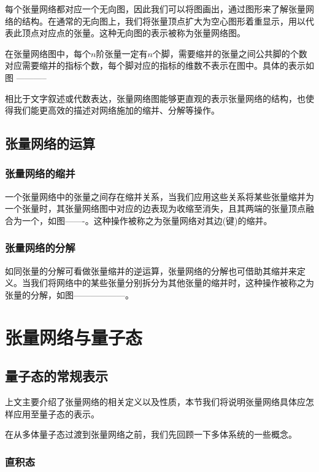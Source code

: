 每个张量网络都对应一个无向图，因此我们可以将图画出，通过图形来了解张量网络的结构。在通常的无向图上，我们将张量顶点扩大为空心图形着重显示，用以代表此顶点对应点的张量。这种无向图的表示被称为张量网络图。

在张量网络图中，每个$n$阶张量一定有$n$个脚，需要缩并的张量之间公共脚的个数对应需要缩并的指标个数，每个脚对应的指标的维数不表示在图中。具体的表示如图 -----------

相比于文字叙述或代数表达，张量网络图能够更直观的表示张量网络的结构，也使得我们能更高效的描述对网络施加的缩并、分解等操作。

\subsection{张量网络的运算}

\subsubsection{张量网络的缩并}

一个张量网络中的张量之间存在缩并关系，当我们应用这些关系将某些张量缩并为一个张量时，其张量网络图中对应的边表现为收缩至消失，且其两端的张量顶点融合为一个，如图-------。这种操作被称之为张量网络对其边(键)的缩并。

\subsubsection{张量网络的分解}

如同张量的分解可看做张量缩并的逆运算，张量网络的分解也可借助其缩并来定义。当我们将网络中的某些张量分别拆分为其他张量的缩并时，这种操作被称之为张量的分解，如图——————。

\section{张量网络与量子态}

\subsection{量子态的常规表示}

上文主要介绍了张量网络的相关定义以及性质，本节我们将说明张量网络具体应怎样应用至量子态的表示。

在从多体量子态过渡到张量网络之前，我们先回顾一下多体系统的一些概念。

\subsubsection{直积态}

